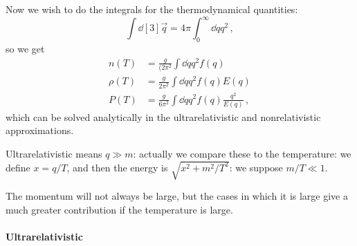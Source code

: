 \documentclass[main.tex]{subfiles}
\begin{document}

Now we wish to do the integrals for the thermodynamical quantities: 
%
\begin{equation}
  \int  \dd[3]{\vec{q}} = 4 \pi \int_0^{\infty}  \dd{q} q^2 
\,,
\end{equation}
%
so we get 
%
\begin{subequations}
\begin{align}
  n(T) &= \frac{g}{(2\pi^2} \int  \dd{q} q^2 f(q) \\ 
  \rho (T) &= \frac{g}{2\pi^2} \int  \dd{q} q^2 f(q) E(q) \\ 
  P (T) &= \frac{g}{6\pi^2} \int  \dd{q} q^2 f(q) \frac{q^2}{E(q)} 
\,,
\end{align}
\end{subequations}
%
which can be solved analytically in the ultrarelativistic and nonrelativistic approximations.

Ultrarelativistic means \(q \gg m\): actually we compare these to the temperature: we define \(x = q/T\), and then the energy is \(\sqrt{x^2+ m^2/T^2} \): we suppose \( m/T \ll 1\).

The momentum will not always be large, but the cases in which it is large give a much greater contribution if the temperature is large.

\paragraph{Ultrarelativistic}
\end{document}
